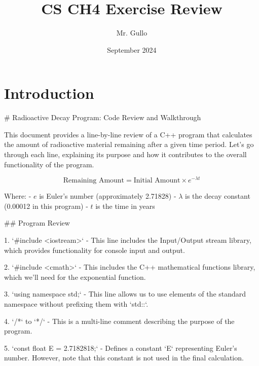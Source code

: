 \documentclass{article}
\title{CS CH4 Exercise Review}
\author{Mr. Gullo}
\date{September 2024}
\begin{document}
\maketitle

\section{Introduction}
# Radioactive Decay Program: Code Review and Walkthrough

This document provides a line-by-line review of a C++ program that calculates the amount of radioactive material remaining after a given time period. Let's go through each line, explaining its purpose and how it contributes to the overall functionality of the program.

$$
\text{Remaining Amount} = \text{Initial Amount} \times e^{-\lambda t}
$$

Where:
- $e$ is Euler's number (approximately 2.71828)
- $\lambda$ is the decay constant (0.00012 in this program)
- $t$ is the time in years

## Program Review

1. `#include <iostream>`
   - This line includes the Input/Output stream library, which provides functionality for console input and output.

2. `#include <cmath>`
   - This includes the C++ mathematical functions library, which we'll need for the exponential function.

3. `using namespace std;`
   - This line allows us to use elements of the standard namespace without prefixing them with `std::`.

4. `/*` to `*/`
   - This is a multi-line comment describing the purpose of the program.

5. `const float E = 2.7182818;`
   - Defines a constant `E` representing Euler's number. However, note that this constant is not used in the final calculation.
\end{document}
